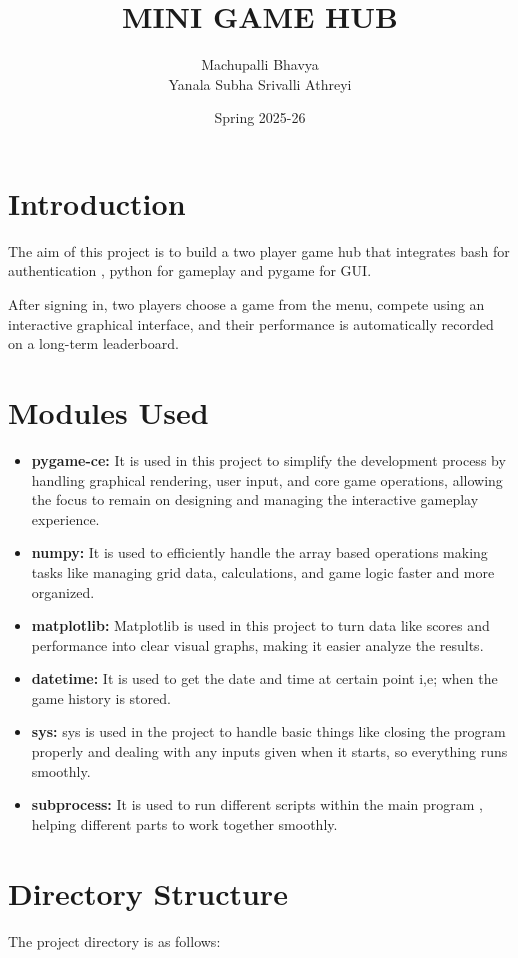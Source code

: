 \documentclass{article}
\title{MINI GAME HUB}
\author{Machupalli Bhavya \\ Yanala Subha Srivalli Athreyi }
\date{Spring 2025-26}
\begin{document}
\maketitle

\tableofcontents
\newpage
\section{Introduction}
The aim of this project is to build a two player game hub that integrates bash for authentication , python for gameplay and pygame for GUI. 

After signing in, two players choose a game from the menu, compete using an interactive graphical interface, and their performance is automatically recorded on a long-term leaderboard.

\section{Modules Used}
\begin{itemize}
    \item \textbf{pygame-ce:} It is used in this project to simplify the development process by handling graphical rendering, user input, and core game operations, allowing the focus to remain on designing and managing the interactive gameplay experience\cite{pygame}.
    \item \textbf{numpy:} It is used to efficiently handle the array based operations making tasks like managing grid data, calculations, and game logic faster and more organized.\cite{numpy}
    \item \textbf{matplotlib:} Matplotlib is used in this project to turn data like scores and performance into clear visual graphs, making it easier analyze the results.\cite{matplotlib}
    \item \textbf{datetime:} It is used to get the date and time at certain point i,e; when the game history is stored.
    \item \textbf{sys:} sys is used in the project to handle basic things like closing the program properly and dealing with any inputs given when it starts, so everything runs smoothly.
    \item \textbf{subprocess:} It is used to run different scripts within the main program , helping different parts to work together smoothly.
    
\end{itemize}

\section{Directory Structure}
The project directory is as follows:
\end{document}
